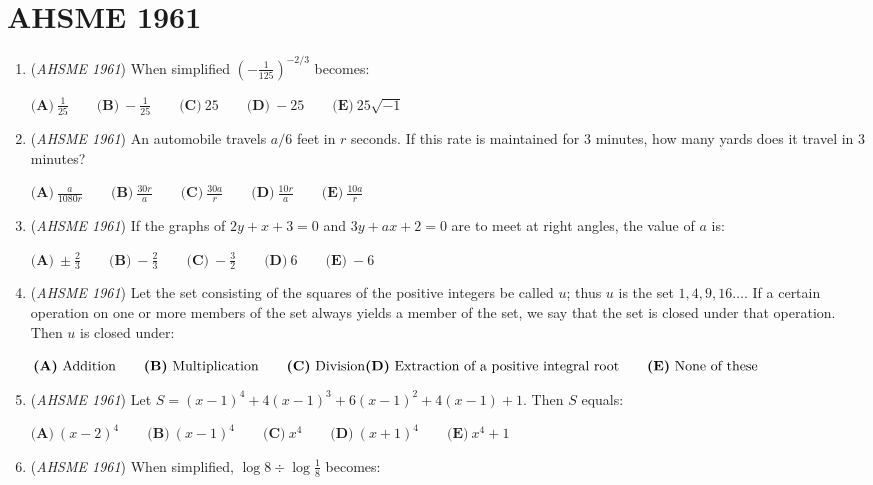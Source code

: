 \section{AHSME 1961}
        \begin{enumerate}
        	\item (\textit{AHSME 1961}) When simplified $(-\frac{1}{125})^{-2/3}$ becomes:


 $\textbf{(A)}\ \frac{1}{25} \qquad \textbf{(B)}\ -\frac{1}{25} \qquad \textbf{(C)}\ 25\qquad \textbf{(D)}\ -25\qquad \textbf{(E)}\ 25\sqrt{-1}$


	\item (\textit{AHSME 1961}) An automobile travels $a/6$ feet in $r$ seconds. If this rate is maintained for $3$ minutes, how many yards does it travel in $3$ minutes?


 $\textbf{(A)}\ \frac{a}{1080r}\qquad \textbf{(B)}\ \frac{30r}{a}\qquad \textbf{(C)}\ \frac{30a}{r}\qquad \textbf{(D)}\ \frac{10r}{a}\qquad \textbf{(E)}\ \frac{10a}{r}$


	\item (\textit{AHSME 1961}) If the graphs of $2y+x+3=0$ and $3y+ax+2=0$ are to meet at right angles, the value of $a$ is:


 $\textbf{(A)}\ \pm \frac{2}{3} \qquad \textbf{(B)}\ -\frac{2}{3}\qquad \textbf{(C)}\ -\frac{3}{2} \qquad \textbf{(D)}\ 6\qquad \textbf{(E)}\ -6$


	\item (\textit{AHSME 1961}) Let the set consisting of the squares of the positive integers be called $u$; thus $u$ is the set $1, 4, 9, 16 \ldots$. 
If a certain operation on one or more members of the set always yields a member of the set, 
we say that the set is closed under that operation. Then $u$ is closed under:


 $\textbf{(A)}\ \text{Addition}\qquad \textbf{(B)}\ \text{Multiplication} \qquad \textbf{(C)}\ \text{Division} \qquad\\ \textbf{(D)}\ \text{Extraction of a positive integral root}\qquad \textbf{(E)}\ \text{None of these}$


	\item (\textit{AHSME 1961}) Let $S=(x-1)^4+4(x-1)^3+6(x-1)^2+4(x-1)+1$. Then $S$ equals:


 $\textbf{(A)}\ (x-2)^4 \qquad \textbf{(B)}\ (x-1)^4 \qquad \textbf{(C)}\ x^4 \qquad \textbf{(D)}\ (x+1)^4 \qquad \textbf{(E)}\ x^4+1$


	\item (\textit{AHSME 1961}) When simplified, $\log{8} \div \log{\frac{1}{8}}$ becomes:



\end{enumerate}
